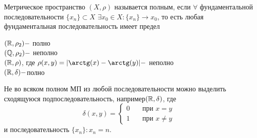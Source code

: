 \begin{definition}
	Метрическое пространство $(X, \rho)$ называется полным, если $\forall$ фундаментальной последовательности $\{ x_n \} \subset X$ $\exists x_0 \in X : \{ x_n \} \to x_0$, то есть любая фундаментальная последовательность имеет предел
\end{definition}

\begin{exercise}
	$(\mathbb{R}, \rho_2) -$ полно\\
	$(\mathbb{Q}, \rho_2) -$ неполно\\
	$(\mathbb{R}, \rho)$, где $\rho(x, y) = |\arctg(x) - \arctg(y)| -$ неполно \\
	$(\mathbb{R}, \delta) - $полно \\
\end{exercise}

\begin{remark}
	Не во всяком полном МП из любой последовательности можно выделить сходящуюся подпоследовательность, например$(\mathbb{R}, \delta)$, где 	
		\[ \delta(x, y) = \begin{cases}
		0	& \quad \text{при } x = y\\
		1	& \quad \text{при } x \neq y
		  \end{cases} \]
	и последовательность $\{x_n\} : x_n = n$.
\end{remark}

